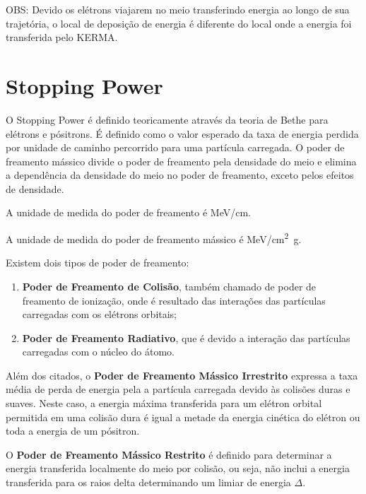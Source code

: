 \documentclass[11pt,a4paper]{article}
\newcounter{exemplo}
\begin{document}
		\textcolor{CarnationPink}{OBS:} Devido os elétrons viajarem no meio transferindo energia ao longo de sua trajetória, o local de deposição de energia é diferente do local onde a energia foi transferida pelo KERMA. 

	\section{Stopping Power}

		O Stopping Power é definido teoricamente através da teoria de Bethe para elétrons e pósitrons. É definido como o valor esperado da taxa de energia perdida por unidade de caminho percorrido para uma partícula carregada. O poder de freamento mássico divide o poder de freamento pela densidade do meio e elimina a dependência da densidade do meio no poder de freamento, exceto pelos efeitos de densidade. 

			\begin{exemplo}[Unidade]

				A unidade de medida do poder de freamento é \unit{MeV/cm}.

				A unidade de medida do poder de freamento mássico é \unit{MeV/cm^2g}.

			\end{exemplo}

		Existem dois tipos de poder de freamento:

		\begin{enumerate}
			\item \textbf{Poder de Freamento de Colisão}, também chamado de poder de freamento de ionização, onde é resultado das interações das partículas carregadas com os elétrons orbitais;
			\item \textbf{Poder de Freamento Radiativo}, que é devido a interação das partículas carregadas com o núcleo do átomo.
		\end{enumerate}

		Além dos citados, o \textbf{Poder de Freamento Mássico Irrestrito} expressa a taxa média de perda de energia pela a partícula carregada devido às colisões duras e suaves. Neste caso, a energia máxima transferida para um elétron orbital permitida em uma colisão dura é igual a metade da energia cinética do elétron ou toda a energia de um pósitron. 


		O \textbf{Poder de Freamento Mássico Restrito} é definido para determinar a energia transferida localmente do meio por colisão, ou seja, não inclui a energia transferida para os raios delta determinando um limiar de energia $\Delta$.
\end{document}
